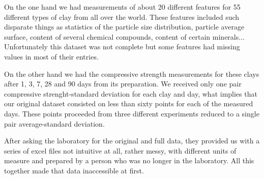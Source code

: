\documentclass[10pt,conference,compsocconf]{IEEEtran}
\begin{document}
On the one hand we had measurements of about 20 different features for 55 different types of clay from all over the world. These features included such disparate things as statistics of the particle size distribution, particle average surface, content of several chemical compounds, content of certain minerals... Unfortunately this dataset was not complete but some features had missing values in most of their entries.

On the other hand we had the compressive strength measurements for these clays after 1, 3, 7, 28 and 90 days from its preparation. We received only one pair compressive strenght-standard deviation for each clay and day, what implies that our original dataset consisted on less than sixty points for each of the measured days. These points proceeded from three different experiments reduced to a single pair average-standard deviation.

After asking the laboratory for the original and full data, they provided us with a series of excel files not intuitive at all, rather messy, with different units of measure and prepared by a person who was no longer in the laboratory. All this together made that data inaccessible at first.





\end{document}
